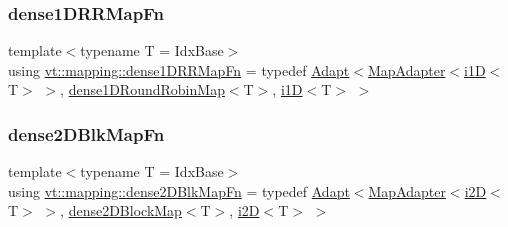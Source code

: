 \subsubsection{\texorpdfstring{dense1\+D\+R\+R\+Map\+Fn}{dense1DRRMapFn}}
{\footnotesize\ttfamily template$<$typename T  = Idx\+Base$>$ \\
using \hyperlink{namespacevt_1_1mapping_a35647c2efdfa50549574fcbd05132dc0}{vt\+::mapping\+::dense1\+D\+R\+R\+Map\+Fn} = typedef \hyperlink{namespacevt_1_1mapping_aafe187035ce8df02f31983e37cdb6a5d}{Adapt}$<$\hyperlink{namespacevt_1_1mapping_a41b113c28bb6430fbcb5be66e08ccf9f}{Map\+Adapter}$<$\hyperlink{namespacevt_1_1mapping_af0c14a9a77e0311b3d089143ed93ba76}{i1D}$<$T$>$ $>$, \hyperlink{namespacevt_1_1mapping_a2a4e62c5dc17da0032d3953c7e3cde8b}{dense1\+D\+Round\+Robin\+Map}$<$T$>$, \hyperlink{namespacevt_1_1mapping_af0c14a9a77e0311b3d089143ed93ba76}{i1D}$<$T$>$ $>$}

\mbox{\label{namespacevt_1_1mapping_a528ef51db9f74e1bb6258a161b329873}} 
\subsubsection{\texorpdfstring{dense2\+D\+Blk\+Map\+Fn}{dense2DBlkMapFn}}
{\footnotesize\ttfamily template$<$typename T  = Idx\+Base$>$ \\
using \hyperlink{namespacevt_1_1mapping_a528ef51db9f74e1bb6258a161b329873}{vt\+::mapping\+::dense2\+D\+Blk\+Map\+Fn} = typedef \hyperlink{namespacevt_1_1mapping_aafe187035ce8df02f31983e37cdb6a5d}{Adapt}$<$\hyperlink{namespacevt_1_1mapping_a41b113c28bb6430fbcb5be66e08ccf9f}{Map\+Adapter}$<$\hyperlink{namespacevt_1_1mapping_a6448c875e0807b43f31e96fc5b0cec04}{i2D}$<$T$>$ $>$, \hyperlink{namespacevt_1_1mapping_aca20bcd20c24f4a43e217ca63bf5812c}{dense2\+D\+Block\+Map}$<$T$>$, \hyperlink{namespacevt_1_1mapping_a6448c875e0807b43f31e96fc5b0cec04}{i2D}$<$T$>$ $>$}

\mbox{\label{namespacevt_1_1mapping_afea13b390fab1d1388658ed759f9f44f}} 

